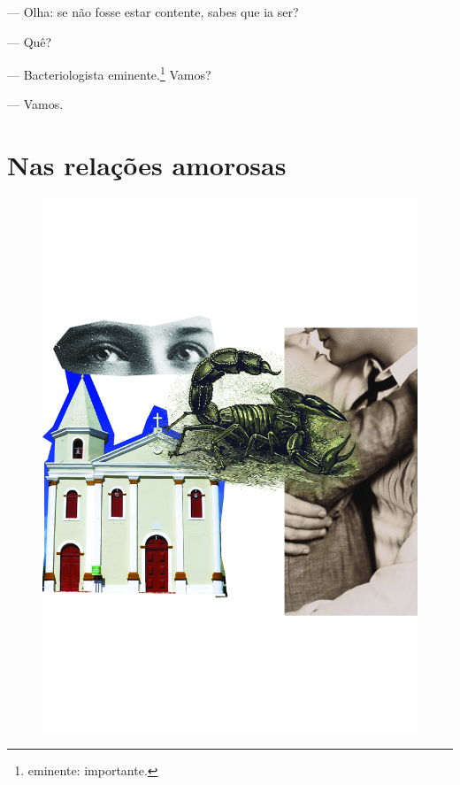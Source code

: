 --- Olha: se não fosse estar contente, sabes que ia ser?

--- Quê?

--- Bacteriologista eminente.\footnote{eminente: importante.} Vamos?

--- Vamos.

\part{Nas relações amorosas}

\pagebreak
\thispagestyle{empty}
\begin{figure}
\includegraphics[width=\textwidth]{./ilustracoes/10_PRIMAS.jpg}
\end{figure}
\pagebreak

